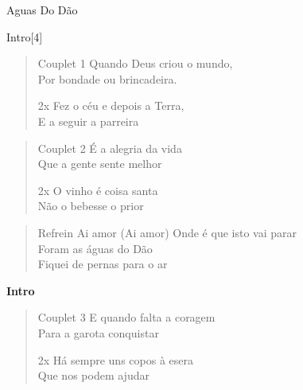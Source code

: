 \begin{song}[huayno]{Aguas Do Dão}
\begin{instrumental}{Intro}[4]
 \measure{}  \measure{}
   
\end{instrumental}

\begin{verse}{Couplet 1}
Quando Deus criou o mundo,\\ 		         
Por bondade ou brincadeira.\\
\begin{sidenote}{2x}
Fez o céu e depois a Terra,\\ 
E a seguir a parreira\\
\end{sidenote}
\end{verse}

\begin{verse}{Couplet 2}
É a alegria da vida\\ 		        
Que a gente sente melhor\\  
\begin{sidenote}{2x}         
O vinho é coisa santa\\
Não o bebesse o prior\\
\end{sidenote}
\end{verse}

\begin{verse}{Refrein}
Ai amor (Ai amor) Onde é que isto vai parar \\
Foram as águas do Dão\\
Fiquei de pernas para o ar\\ 
\end{verse}

\textbf{Intro}\\

\begin{verse}{Couplet 3}
E quando falta a coragem\\ 
Para a garota conquistar \\
\begin{sidenote}{2x}
Há sempre uns copos à esera\\ 
Que nos podem ajudar\\
\end{sidenote}
\end{verse}


\end{song}
